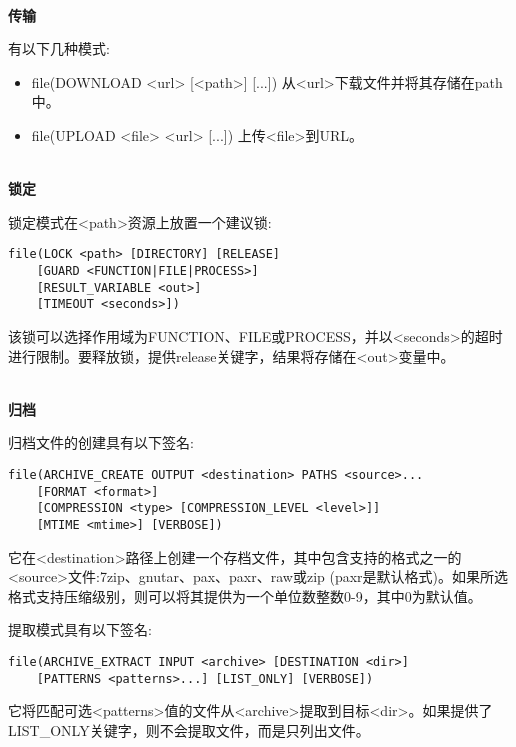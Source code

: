 \hspace*{\fill} \\ %
\noindent
\textbf{传输}

有以下几种模式:

\begin{itemize}
\item 
file(DOWNLOAD <url> [<path>] [...]) 从<url>下载文件并将其存储在path中。

\item 
file(UPLOAD <file> <url> [...]) 上传<file>到URL。
\end{itemize}


\hspace*{\fill} \\ %
\noindent
\textbf{锁定}

锁定模式在<path>资源上放置一个建议锁:

\begin{lstlisting}[style=styleCMake]
file(LOCK <path> [DIRECTORY] [RELEASE]
	[GUARD <FUNCTION|FILE|PROCESS>]
	[RESULT_VARIABLE <out>]
	[TIMEOUT <seconds>])
\end{lstlisting}

该锁可以选择作用域为FUNCTION、FILE或PROCESS，并以<seconds>的超时进行限制。要释放锁，提供release关键字，结果将存储在<out>变量中。

\hspace*{\fill} \\ %
\noindent
\textbf{归档}

归档文件的创建具有以下签名:

\begin{lstlisting}[style=styleCMake]
file(ARCHIVE_CREATE OUTPUT <destination> PATHS <source>...
	[FORMAT <format>]
	[COMPRESSION <type> [COMPRESSION_LEVEL <level>]]
	[MTIME <mtime>] [VERBOSE])
\end{lstlisting}

它在<destination>路径上创建一个存档文件，其中包含支持的格式之一的<source>文件:7zip、gnutar、pax、paxr、raw或zip (paxr是默认格式)。如果所选格式支持压缩级别，则可以将其提供为一个单位数整数0-9，其中0为默认值。

提取模式具有以下签名:

\begin{lstlisting}[style=styleCMake]
file(ARCHIVE_EXTRACT INPUT <archive> [DESTINATION <dir>]
	[PATTERNS <patterns>...] [LIST_ONLY] [VERBOSE])
\end{lstlisting}

它将匹配可选<patterns>值的文件从<archive>提取到目标<dir>。如果提供了LIST\_ONLY关键字，则不会提取文件，而是只列出文件。




